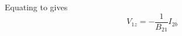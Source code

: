 \documentclass[a4paper, 12pt]{article}
\begin{document}
Equating  to  gives
%
\begin{equation}
  V_{1z} = -\frac{1}{B_{21}} I_{2b}
\end{equation}









\end{document}
